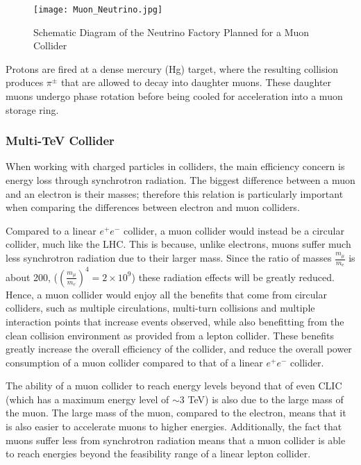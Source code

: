 \begin{figure}[!htb]
\centering
\texttt{[image: Muon\_Neutrino.jpg]}
\caption{Schematic Diagram of the Neutrino Factory Planned for a Muon Collider}
\end{figure}
 
Protons are fired at a dense mercury (Hg) target, where the resulting collision produces $\pi^{\pm}$ that are allowed to decay into daughter muons. These daughter muons undergo phase rotation before being cooled for acceleration into a muon storage ring.
 
\subsubsection{Multi-TeV Collider}
 
When working with charged particles in colliders, the main efficiency concern is energy loss through synchrotron radiation. The biggest difference between a muon and an electron is their masses; therefore this relation is particularly important when comparing the differences between electron and muon colliders.
 
Compared to a linear $e^+ e^-$ collider, a muon collider would instead be a circular collider, much like the LHC. This is because, unlike electrons, muons suffer much less synchrotron radiation due to their larger mass. Since the ratio of masses $\frac{m_{\mu}}{m_e}$ is about 200, ($(\frac{m_{\mu}}{m_e})^4 = 2 \times 10^9$) these radiation effects will be greatly reduced. Hence, a muon collider would enjoy all the benefits that come from circular colliders, such as multiple circulations, multi-turn collisions and multiple interaction points that increase events observed, while also benefitting from the clean collision environment as provided from a lepton collider. These benefits greatly increase the overall efficiency of the collider, and reduce the overall power consumption of a muon collider compared to that of a linear $e^+ e^-$ collider.
 
The ability of a muon collider to reach energy levels beyond that of even CLIC (which has a maximum energy level of $\sim$3 TeV) is also due to the large mass of the muon. The large mass of the muon, compared to the electron, means that it is also easier to accelerate muons to higher energies. Additionally, the fact that muons suffer less from synchrotron radiation means that a muon collider is able to reach energies beyond the feasibility range of a linear lepton collider.
 
